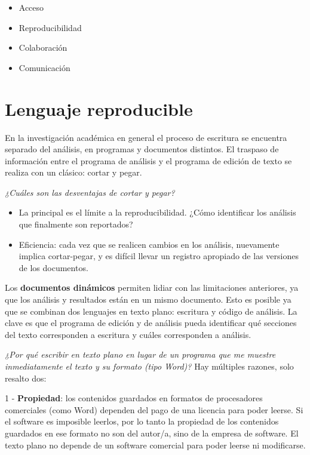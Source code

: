 \documentclass[
  11pt,
]{book}
\providecommand{\tightlist}{%
  \setlength{\itemsep}{0pt}\setlength{\parskip}{0pt}}
\begin{document}
\begin{itemize}
\tightlist
\item
  Acceso
\item
  Reproducibilidad
\item
  Colaboración
\item
  Comunicación
\end{itemize}

\hypertarget{lenguaje-reproducible}{%
\chapter{Lenguaje reproducible}\label{lenguaje-reproducible}}

En la investigación académica en general el proceso de escritura se encuentra separado del análisis, en programas y documentos distintos. El traspaso de información entre el programa de análisis y el programa de edición de texto se realiza con un clásico: cortar y pegar.

\emph{¿Cuáles son las desventajas de cortar y pegar?}

\begin{itemize}
\item
  La principal es el límite a la reproducibilidad. ¿Cómo identificar los análisis que finalmente son reportados?
\item
  Eficiencia: cada vez que se realicen cambios en los análisis, nuevamente implica cortar-pegar, y es difícil llevar un registro apropiado de las versiones de los documentos.
\end{itemize}

Los \textbf{documentos dinámicos} permiten lidiar con las limitaciones anteriores, ya que los análisis y resultados están en un mismo documento. Esto es posible ya que se combinan dos lenguajes en texto plano: escritura y código de análisis. La clave es que el programa de edición y de análisis pueda identificar qué secciones del texto corresponden a escritura y cuáles corresponden a análisis.

\emph{¿Por qué escribir en texto plano en lugar de un programa que me muestre inmediatamente el texto y su formato (tipo Word)?}
Hay múltiples razones, solo resalto dos:

1 - \textbf{Propiedad}: los contenidos guardados en formatos de procesadores comerciales (como Word) dependen del pago de una licencia para poder leerse. Si el software es imposible leerlos, por lo tanto la propiedad de los contenidos guardados en ese formato no son del autor/a, sino de la empresa de software. El texto plano no depende de un software comercial para poder leerse ni modificarse.
\end{document}
